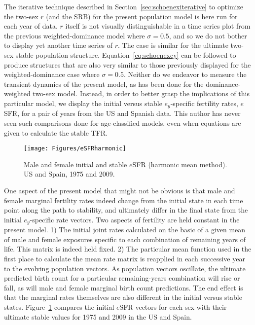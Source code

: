 \FloatBarrier
The iterative technique described in Section~\ref{sec:schoenexiterative} to
optimize the two-sex $r$ (and the SRB) for the present population model is here
run for each year of data. $r$ itself
is not visually distinguishable in a time series plot from the previous
weighted-dominance model where $\sigma = 0.5$, and so we do not bother to display 
yet another time series of $r$. The case is
similar for the ultimate two-sex stable population structure.
Equation~\eqref{eq:schoenexcy} can be followed to produce structures that are also very similar to those
previously displayed for the weighted-dominance case where $\sigma = 0.5$.
Neither do we endeavor to measure the transient dynamics of the present model, 
as has been done for the dominance-weighted two-sex model. Instead, in order 
to better grasp the implications of this particular model, we display the
initial versus stable $e_y$-specific fertility rates, $e$SFR, for a pair of years from 
the US and Spanish data. This author has never seen such comparisons done for 
age-classified models, even when equations are given to calculate the stable
TFR.

\begin{figure}[ht!]
        \centering  
          \caption{Male and female initial and stable $e$SFR (harmonic mean
          method). US and Spain, 1975 and 2009.}
           \texttt{[image: Figures/eSFRharmonic]}
          \label{fig:eSFRharmonic}
\end{figure}

One aspect of the present model that might not be obvious is that male and
female marginal fertility rates indeed change from the initial state in each time point along
the path to stability, and ultimately differ in the final state from the initial
$e_y$-specific rate vectors. Two aspects of fertility are held constant in the
present model. 1) The initial joint rates calculated on the basic of a given
mean of male and female exposures specific to each combination of remaining
years of life. This matrix is indeed held fixed. 2) The particular mean function
used in the first place to calculate the mean rate matrix is reapplied in each
successive year to the evolving population vectors. As population vectors
oscillate, the ultimate predicted birth count for a particular remaining-years
combination will rise or fall, as will male and female marginal birth count
predictions. The end effect is that the marginal rates themselves are also
different in the initial versus stable states. Figure~\ref{fig:eSFRharmonic}
compares the initial $e$SFR vectors for each sex with their ultimate stable
values for 1975 and 2009 in the US and Spain.

